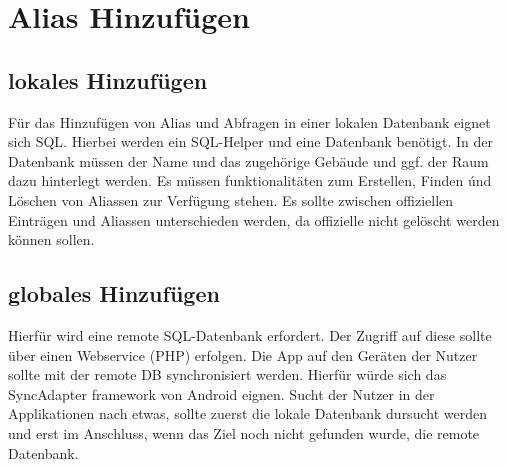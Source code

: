 \newpage
\section{Alias Hinzufügen}

\subsection{lokales Hinzufügen}

Für das Hinzufügen von Alias und Abfragen in einer lokalen Datenbank eignet sich SQL. Hierbei werden
ein SQL-Helper und eine Datenbank benötigt. In der Datenbank müssen der Name und das zugehörige Gebäude und ggf. 
der Raum dazu hinterlegt werden. Es müssen funktionalitäten zum Erstellen, Finden únd Löschen von Aliassen zur Verfügung stehen.
Es sollte zwischen offiziellen Einträgen und Aliassen unterschieden werden, da offizielle nicht gelöscht werden können sollen.

\subsection{globales Hinzufügen}

Hierfür wird eine remote SQL-Datenbank erfordert. Der Zugriff auf diese sollte über einen Webservice (PHP) erfolgen.
Die App auf den Geräten der Nutzer sollte mit der remote DB synchronisiert werden. Hierfür würde sich das SyncAdapter framework
von Android eignen. Sucht der Nutzer in der Applikationen nach etwas, sollte zuerst die lokale Datenbank dursucht werden und 
erst im Anschluss, wenn das Ziel noch nicht gefunden wurde, die remote Datenbank.